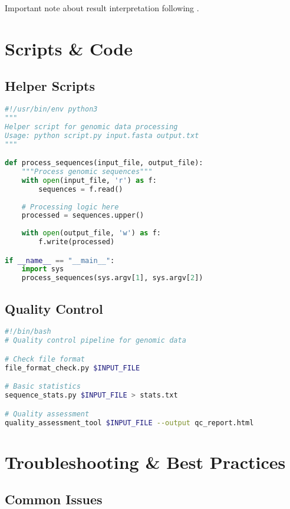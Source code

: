 \documentclass[a4paper,11pt]{article}
\begin{document}
\begin{remark}
Important note about result interpretation following \citet{author2024}.
\end{remark}

\section{Scripts \& Code}

\subsection{Helper Scripts}
\begin{lstlisting}[language=Python, caption=Data processing script]
#!/usr/bin/env python3
"""
Helper script for genomic data processing
Usage: python script.py input.fasta output.txt
"""

def process_sequences(input_file, output_file):
    """Process genomic sequences"""
    with open(input_file, 'r') as f:
        sequences = f.read()
    
    # Processing logic here
    processed = sequences.upper()
    
    with open(output_file, 'w') as f:
        f.write(processed)

if __name__ == "__main__":
    import sys
    process_sequences(sys.argv[1], sys.argv[2])
\end{lstlisting}

\subsection{Quality Control}
\begin{lstlisting}[language=bash, caption=QC pipeline]
#!/bin/bash
# Quality control pipeline for genomic data

# Check file format
file_format_check.py $INPUT_FILE

# Basic statistics
sequence_stats.py $INPUT_FILE > stats.txt

# Quality assessment
quality_assessment_tool $INPUT_FILE --output qc_report.html
\end{lstlisting}

\section{Troubleshooting \& Best Practices}

\subsection{Common Issues}
\end{document}
